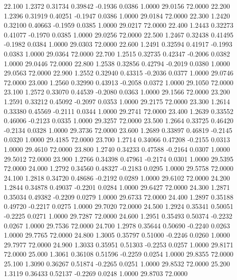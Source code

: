   22.100   1.2372   0.31734   0.39842  -0.1936   0.0386   1.0000  29.0156  72.0000
  22.200   1.2396   0.31919   0.40251  -0.1947   0.0386   1.0000  29.0184  72.0000
  22.300   1.2420   0.32100   0.40663  -0.1959   0.0385   1.0000  29.0217  72.0000
  22.400   1.2443   0.32273   0.41077  -0.1970   0.0385   1.0000  29.0256  72.0000
  22.500   1.2467   0.32438   0.41495  -0.1982   0.0384   1.0000  29.0303  72.0000
  22.600   1.2491   0.32594   0.41917  -0.1993   0.0383   1.0000  29.0364  72.0000
  22.700   1.2515   0.32735   0.42347  -0.2006   0.0382   1.0000  29.0446  72.0000
  22.800   1.2538   0.32856   0.42794  -0.2019   0.0380   1.0000  29.0563  72.0000
  22.900   1.2552   0.32940   0.43315  -0.2036   0.0377   1.0000  29.0746  72.0000
  23.000   1.2560   0.32990   0.43913  -0.2058   0.0372   1.0000  29.1050  72.0000
  23.100   1.2572   0.33070   0.44539  -0.2080   0.0363   1.0000  29.1566  72.0000
  23.200   1.2591   0.33212   0.45092  -0.2097   0.0353   1.0000  29.2175  72.0000
  23.300   1.2614   0.33380   0.45569  -0.2111   0.0344   1.0000  29.2741  72.0000
  23.400   1.2639   0.33552   0.46006  -0.2123   0.0335   1.0000  29.3257  72.0000
  23.500   1.2664   0.33725   0.46420  -0.2134   0.0328   1.0000  29.3736  72.0000
  23.600   1.2689   0.33897   0.46819  -0.2145   0.0320   1.0000  29.4185  72.0000
  23.700   1.2714   0.34066   0.47208  -0.2155   0.0313   1.0000  29.4610  72.0000
  23.800   1.2740   0.34233   0.47588  -0.2164   0.0307   1.0000  29.5012  72.0000
  23.900   1.2766   0.34398   0.47961  -0.2174   0.0301   1.0000  29.5395  72.0000
  24.000   1.2792   0.34560   0.48327  -0.2183   0.0295   1.0000  29.5758  72.0000
  24.100   1.2818   0.34720   0.48686  -0.2192   0.0289   1.0000  29.6102  72.0000
  24.200   1.2844   0.34878   0.49037  -0.2201   0.0284   1.0000  29.6427  72.0000
  24.300   1.2871   0.35034   0.49382  -0.2209   0.0279   1.0000  29.6733  72.0000
  24.400   1.2897   0.35188   0.49720  -0.2217   0.0275   1.0000  29.7020  72.0000
  24.500   1.2924   0.35341   0.50051  -0.2225   0.0271   1.0000  29.7287  72.0000
  24.600   1.2951   0.35493   0.50374  -0.2232   0.0267   1.0000  29.7536  72.0000
  24.700   1.2978   0.35644   0.50690  -0.2240   0.0263   1.0000  29.7765  72.0000
  24.800   1.3005   0.35797   0.51000  -0.2246   0.0260   1.0000  29.7977  72.0000
  24.900   1.3033   0.35951   0.51303  -0.2253   0.0257   1.0000  29.8171  72.0000
  25.000   1.3061   0.36108   0.51596  -0.2259   0.0254   1.0000  29.8355  72.0000
  25.100   1.3090   0.36267   0.51874  -0.2265   0.0251   1.0000  29.8532  72.0000
  25.200   1.3119   0.36433   0.52137  -0.2269   0.0248   1.0000  29.8703  72.0000
